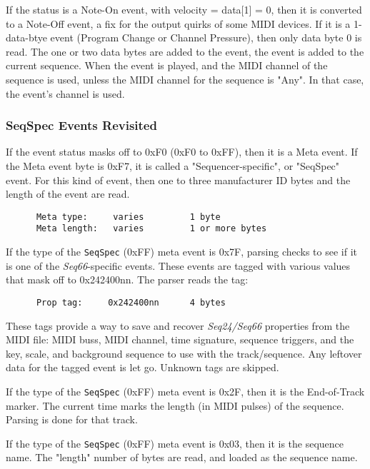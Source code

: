    If the status is a Note-On event, with velocity = data[1] = 0,
   then it is converted to a Note-Off event, a fix for the output quirks of
   some MIDI devices.
   If it is a 1-data-btye event (Program Change or Channel Pressure), then only
   data byte 0 is read.
   The one or two data bytes are added to the event,
   the event is added to the current sequence.
   When the event is played,
   and the MIDI channel of the sequence is used, unless
   the MIDI channel for the sequence is "Any".
   In that case, the event's channel is used.

\subsubsection{SeqSpec Events Revisited}
\label{subsubsec:midi_format_seqspec_events_revisited}

   If the event status masks off to 0xF0 (0xF0 to 0xFF), then it is a Meta
   event.  If the Meta event byte is 0xF7, it is called a "Sequencer-specific",
   or "SeqSpec" event.  For this kind of event, then one to three manufacturer
   ID bytes and the length of the event are read.

   \begin{verbatim}
      Meta type:     varies         1 byte
      Meta length:   varies         1 or more bytes
   \end{verbatim}

   If the type of the
   \texttt{SeqSpec} (0xFF) meta event is 0x7F, parsing checks to see
   if it is one of the \textsl{Seq66}-specific events.  These events are tagged
   with various values that mask off to 0x242400nn.  The parser reads the
   tag:

   \begin{verbatim}
      Prop tag:     0x242400nn      4 bytes
   \end{verbatim}

   These tags provide a way to save and recover \textsl{Seq24/Seq66} properties
   from the MIDI file: MIDI buss, MIDI channel, time signature, sequence
   triggers, and the key, scale, and background sequence to use with the
   track/sequence.  Any leftover data for the tagged event is let go.
   Unknown tags are skipped.

   If the type of the
   \texttt{SeqSpec} (0xFF) meta event is 0x2F, then it is the
   End-of-Track marker.  The current time marks the length (in MIDI pulses) of
   the sequence.  Parsing is done for that track.

   If the type of the
   \texttt{SeqSpec} (0xFF) meta event is 0x03, then it is the
   sequence name.  The "length" number of bytes are read, and loaded as the
   sequence name.

